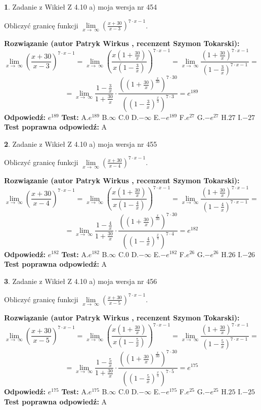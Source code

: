 \documentclass[12pt, a4paper]{article}
\theoremstyle{definition} %
\newtheorem{zad}{}
\newcommand{\zadStart}[1]{\begin{zad}#1\newline}
\newcommand{\zadStop}{\end{zad}}
\newcommand{\rozwStart}[2]{\noindent \textbf{Rozwiązanie (autor #1 , recenzent #2): }\newline}
\newcommand{\rozwStop}{\newline}
\newcommand{\odpStart}{\noindent \textbf{Odpowiedź:}\newline}
\newcommand{\odpStop}{\newline}
\newcommand{\testStart}{\noindent \textbf{Test:}\newline}
\newcommand{\testStop}{\newline}
\newcommand{\kluczStart}{\noindent \textbf{Test poprawna odpowiedź:}\newline}
\newcommand{\kluczStop}{\newline}
\begin{document}
\zadStart{Zadanie z Wikieł Z 4.10 a) moja wersja nr 454}

Obliczyć granicę funkcji  $\lim\limits_{x\to\ \infty}(\frac{x+30}{x-3})^{7\cdot x-1}$.
\zadStop
\rozwStart{Patryk Wirkus}{Szymon Tokarski}
$$\lim\limits_{x\to\ \infty}(\frac{x+30}{x-3})^{7\cdot x-1} = \lim\limits_{x\to\ \infty}(\frac{x(1+\frac{30}{x})}{x(1-\frac{3}{x})})^{7\cdot x-1}=\lim\limits_{x\to\ \infty}\frac{(1+\frac{30}{x})^{7\cdot x-1}}{(1-\frac{3}{x})^{7\cdot x-1}}=$$
$$=\lim\limits_{x\to\ \infty}\frac{1-\frac{3}{x}}{1+\frac{30}{x}}\cdot\frac{((1+\frac{30}{x})^{\frac{x}{30}})^{7\cdot30}}{((1-\frac{3}{x})^{\frac{x}{3}})^{7\cdot3}}=e^{189}$$
\rozwStop
\odpStart
$e^{189}$
\odpStop
\testStart
A.$e^{189}$ B.$\infty$ C.$0$ D.$-\infty$ E.$-e^{189}$
F.$e^{27}$ G.$-e^{27}$
H.$27$
I.$-27$
\testStop
\kluczStart
A
\kluczStop



\zadStart{Zadanie z Wikieł Z 4.10 a) moja wersja nr 455}

Obliczyć granicę funkcji  $\lim\limits_{x\to\ \infty}(\frac{x+30}{x-4})^{7\cdot x-1}$.
\zadStop
\rozwStart{Patryk Wirkus}{Szymon Tokarski}
$$\lim\limits_{x\to\ \infty}(\frac{x+30}{x-4})^{7\cdot x-1} = \lim\limits_{x\to\ \infty}(\frac{x(1+\frac{30}{x})}{x(1-\frac{4}{x})})^{7\cdot x-1}=\lim\limits_{x\to\ \infty}\frac{(1+\frac{30}{x})^{7\cdot x-1}}{(1-\frac{4}{x})^{7\cdot x-1}}=$$
$$=\lim\limits_{x\to\ \infty}\frac{1-\frac{4}{x}}{1+\frac{30}{x}}\cdot\frac{((1+\frac{30}{x})^{\frac{x}{30}})^{7\cdot30}}{((1-\frac{4}{x})^{\frac{x}{4}})^{7\cdot4}}=e^{182}$$
\rozwStop
\odpStart
$e^{182}$
\odpStop
\testStart
A.$e^{182}$ B.$\infty$ C.$0$ D.$-\infty$ E.$-e^{182}$
F.$e^{26}$ G.$-e^{26}$
H.$26$
I.$-26$
\testStop
\kluczStart
A
\kluczStop



\zadStart{Zadanie z Wikieł Z 4.10 a) moja wersja nr 456}

Obliczyć granicę funkcji  $\lim\limits_{x\to\ \infty}(\frac{x+30}{x-5})^{7\cdot x-1}$.
\zadStop
\rozwStart{Patryk Wirkus}{Szymon Tokarski}
$$\lim\limits_{x\to\ \infty}(\frac{x+30}{x-5})^{7\cdot x-1} = \lim\limits_{x\to\ \infty}(\frac{x(1+\frac{30}{x})}{x(1-\frac{5}{x})})^{7\cdot x-1}=\lim\limits_{x\to\ \infty}\frac{(1+\frac{30}{x})^{7\cdot x-1}}{(1-\frac{5}{x})^{7\cdot x-1}}=$$
$$=\lim\limits_{x\to\ \infty}\frac{1-\frac{5}{x}}{1+\frac{30}{x}}\cdot\frac{((1+\frac{30}{x})^{\frac{x}{30}})^{7\cdot30}}{((1-\frac{5}{x})^{\frac{x}{5}})^{7\cdot5}}=e^{175}$$
\rozwStop
\odpStart
$e^{175}$
\odpStop
\testStart
A.$e^{175}$ B.$\infty$ C.$0$ D.$-\infty$ E.$-e^{175}$
F.$e^{25}$ G.$-e^{25}$
H.$25$
I.$-25$
\testStop
\kluczStart
A
\kluczStop
\end{document}

